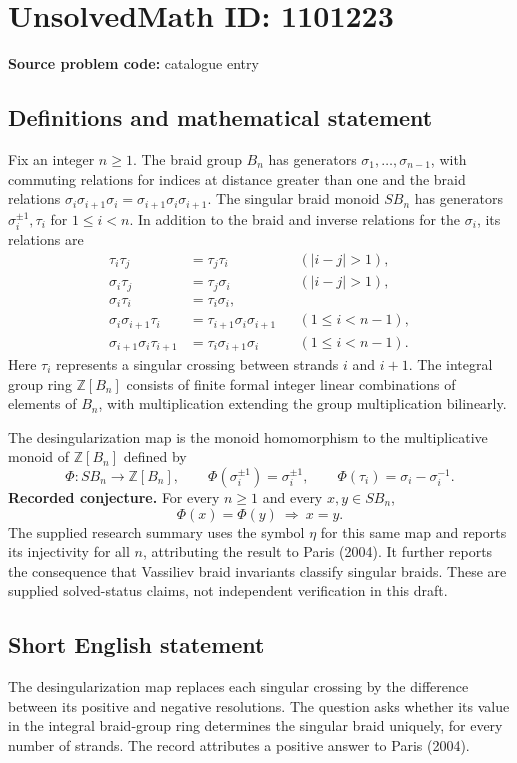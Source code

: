 \documentclass[11pt]{article}
\newcommand{\Z}{\mathbb{Z}}
\begin{document}
\section*{UnsolvedMath ID: 1101223}
\textbf{Source problem code:} catalogue entry
\subsection{Definitions and mathematical statement}
Fix an integer $n\geq1$. The braid group $B_n$ has generators $\sigma_1,\ldots,\sigma_{n-1}$, with commuting relations for indices at distance greater than one and the braid relations $\sigma_i\sigma_{i+1}\sigma_i=\sigma_{i+1}\sigma_i\sigma_{i+1}$. The singular braid monoid $SB_n$ has generators $\sigma_i^{\pm1},\tau_i$ for $1\leq i<n$. In addition to the braid and inverse relations for the $\sigma_i$, its relations are
\[
\begin{aligned}
 \tau_i\tau_j&=\tau_j\tau_i &&(|i-j|>1),\\
 \sigma_i\tau_j&=\tau_j\sigma_i &&(|i-j|>1),\\
 \sigma_i\tau_i&=\tau_i\sigma_i,\\
 \sigma_i\sigma_{i+1}\tau_i&=\tau_{i+1}\sigma_i\sigma_{i+1} &&(1\leq i<n-1),\\
 \sigma_{i+1}\sigma_i\tau_{i+1}&=\tau_i\sigma_{i+1}\sigma_i &&(1\leq i<n-1).
\end{aligned}
\]
Here $\tau_i$ represents a singular crossing between strands $i$ and $i+1$. The integral group ring $\Z[B_n]$ consists of finite formal integer linear combinations of elements of $B_n$, with multiplication extending the group multiplication bilinearly.

The desingularization map is the monoid homomorphism to the multiplicative monoid of $\Z[B_n]$ defined by
\[
 \Phi:SB_n\longrightarrow\Z[B_n],\qquad
 \Phi(\sigma_i^{\pm1})=\sigma_i^{\pm1},\qquad
 \Phi(\tau_i)=\sigma_i-\sigma_i^{-1}.
\]
\textbf{Recorded conjecture.} For every $n\geq1$ and every $x,y\in SB_n$,
\[
 \Phi(x)=\Phi(y)\ \Longrightarrow\ x=y.
\]
The supplied research summary uses the symbol $\eta$ for this same map and reports its injectivity for all $n$, attributing the result to Paris (2004). It further reports the consequence that Vassiliev braid invariants classify singular braids. These are supplied solved-status claims, not independent verification in this draft.
\subsection{Short English statement}
The desingularization map replaces each singular crossing by the difference between its positive and negative resolutions. The question asks whether its value in the integral braid-group ring determines the singular braid uniquely, for every number of strands. The record attributes a positive answer to Paris (2004).
\end{document}
